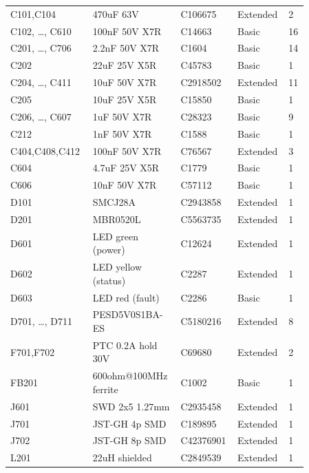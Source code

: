 \begin{hsblock}
\par\vspace{8pt}
{\scriptsize
\renewcommand{\arraystretch}{1.12}
\begin{tabular}{L{0.26\linewidth} L{0.28\linewidth} L{0.14\linewidth} L{0.12\linewidth} L{0.06\linewidth}}
\hstoprule
{} &  &  &  &  \\
\hline
C101,C104 & 470uF 63V & C106675 & Extended & 2 \\
C102, \ldots, C610 & 100nF 50V X7R & C14663 & Basic & 16 \\
C201, \ldots, C706 & 2.2nF 50V X7R & C1604 & Basic & 14 \\
C202 & 22uF 25V X5R & C45783 & Basic & 1 \\
C204, \ldots, C411 & 10uF 50V X7R & C2918502 & Extended & 11 \\
C205 & 10uF 25V X5R & C15850 & Basic & 1 \\
C206, \ldots, C607 & 1uF 50V X7R & C28323 & Basic & 9 \\
C212 & 1nF 50V X7R & C1588 & Basic & 1 \\
C404,C408,C412 & 100nF 50V X7R & C76567 & Extended & 3 \\
C604 & 4.7uF 25V X5R & C1779 & Basic & 1 \\
C606 & 10nF 50V X7R & C57112 & Basic & 1 \\
D101 & SMCJ28A & C2943858 & Extended & 1 \\
D201 & MBR0520L & C5563735 & Extended & 1 \\
D601 & LED green (power) & C12624 & Extended & 1 \\
D602 & LED yellow (status) & C2287 & Extended & 1 \\
D603 & LED red (fault) & C2286 & Basic & 1 \\
D701, \ldots, D711 & PESD5V0S1BA-ES & C5180216 & Extended & 8 \\
F701,F702 & PTC 0.2A hold 30V & C69680 & Extended & 2 \\
FB201 & 600ohm@100MHz ferrite & C1002 & Basic & 1 \\
J601 & SWD 2x5 1.27mm & C2935458 & Extended & 1 \\
J701 & JST-GH 4p SMD & C189895 & Extended & 1 \\
J702 & JST-GH 8p SMD & C42376901 & Extended & 1 \\
L201 & 22uH shielded & C2849539 & Extended & 1 \\

\end{tabular}}
\end{hsblock}
